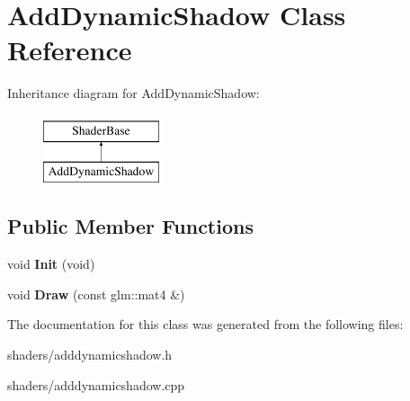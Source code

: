 \hypertarget{classAddDynamicShadow}{\section{\-Add\-Dynamic\-Shadow \-Class \-Reference}
\label{classAddDynamicShadow}
}
\-Inheritance diagram for \-Add\-Dynamic\-Shadow\-:\begin{figure}[H]
\begin{center}
\leavevmode
\includegraphics[height=2.000000cm]{classAddDynamicShadow}
\end{center}
\end{figure}
\subsection*{\-Public \-Member \-Functions}
\begin{DoxyCompactItemize}
\item 
\hypertarget{classAddDynamicShadow_a6fbbaa0fff511fbda7fce23a497a2a45}{void {\bfseries \-Init} (void)}\label{classAddDynamicShadow_a6fbbaa0fff511fbda7fce23a497a2a45}

\item 
\hypertarget{classAddDynamicShadow_af4a820a8e394e08d91d020f0b569957f}{void {\bfseries \-Draw} (const glm\-::mat4 \&)}\label{classAddDynamicShadow_af4a820a8e394e08d91d020f0b569957f}

\end{DoxyCompactItemize}


\-The documentation for this class was generated from the following files\-:\begin{DoxyCompactItemize}
\item 
shaders/adddynamicshadow.\-h\item 
shaders/adddynamicshadow.\-cpp\end{DoxyCompactItemize}
